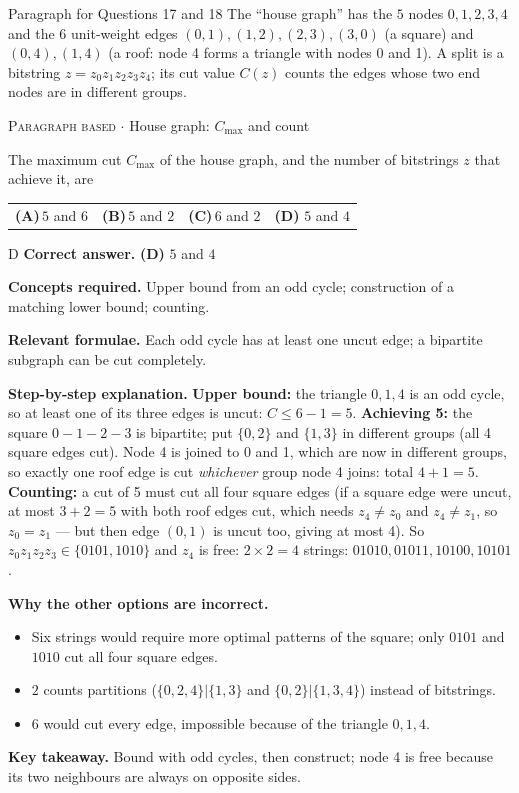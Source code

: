 \documentclass[11pt,a4paper]{article}
\newcommand{\optlabel}[1]{\textbf{(#1)}}
\newcommand{\correctlabel}[1]{\textcolor{okgreen}{\textbf{(#1)}\,\ding{51}}}
\newenvironment{qitem}[1]{\begin{list}{}{\setlength{\leftmargin}{3.3em}\setlength{\labelwidth}{3.1em}%
  \setlength{\labelsep}{0.2em}\setlength{\topsep}{3pt}\setlength{\parsep}{3pt}}\item[\textbf{Q.#1}\hfill]}{\end{list}}
\newcommand{\qmeta}[2]{{\footnotesize\color{black!60}\textsc{#1} \;$\cdot$\; #2}\par}
\begin{document}
\begin{passagebox}{Paragraph for Questions 17 and 18}
The ``house graph'' has the $5$ nodes $0, 1, 2, 3, 4$ and the $6$ unit-weight edges
$(0,1), (1,2), (2,3), (3,0)$ (a square) and $(0,4), (1,4)$ (a roof: node 4 forms a triangle with nodes 0 and 1).
A split is a bitstring $z = z_0z_1z_2z_3z_4$; its cut value $C(z)$ counts the edges whose two end nodes are in different
groups.
\end{passagebox}
\begin{qitem}{17}
\qmeta{Paragraph based}{House graph: $C_{\max}$ and count}
The maximum cut $C_{\max}$ of the house graph, and the number of bitstrings $z$ that achieve it, are
\par\smallskip\noindent\begin{tabularx}{\linewidth}{@{}*{4}{L}@{}}
\optlabel{A}\,$5$ and $6$ & \optlabel{B}\,$5$ and $2$ & \optlabel{C}\,$6$ and $2$ & \correctlabel{D}\,$5$ and $4$
\end{tabularx}
\end{qitem}
\begin{solbox}{D}
\textbf{\color{brand}Correct answer.} \textcolor{okgreen}{\textbf{(D)}} $5$ and $4$

\textbf{\color{brand}Concepts required.} Upper bound from an odd cycle; construction of a matching lower bound; counting.

\textbf{\color{brand}Relevant formulae.} Each odd cycle has at least one uncut edge; a bipartite subgraph can be cut completely.

\textbf{\color{brand}Step-by-step explanation.} \textbf{Upper bound:} the triangle $0,1,4$ is an odd cycle, so at least one of its three edges is uncut: $C \le 6 - 1 = 5$.
\textbf{Achieving 5:} the square $0{-}1{-}2{-}3$ is bipartite; put $\{0, 2\}$ and $\{1, 3\}$ in different groups (all 4 square
edges cut). Node 4 is joined to 0 and 1, which are now in different groups, so exactly one roof edge is cut \emph{whichever}
group node 4 joins: total $4 + 1 = 5$.
\textbf{Counting:} a cut of 5 must cut all four square edges (if a square edge were uncut, at most $3 + 2 = 5$ with both roof
edges cut, which needs $z_4 \neq z_0$ and $z_4 \neq z_1$, so $z_0 = z_1$ --- but then edge $(0,1)$ is uncut too, giving at most 4).
So $z_0z_1z_2z_3 \in \{0101, 1010\}$ and $z_4$ is free: $2 \times 2 = 4$ strings: $01010, 01011, 10100, 10101$.

\textbf{\color{brand}Why the other options are incorrect.}
\begin{itemize}[leftmargin=2.4em, itemsep=1pt, topsep=2pt]
\item[\textbf{(A)}] Six strings would require more optimal patterns of the square; only $0101$ and $1010$ cut all four square edges.
\item[\textbf{(B)}] $2$ counts partitions ($\{0,2,4\}|\{1,3\}$ and $\{0,2\}|\{1,3,4\}$) instead of bitstrings.
\item[\textbf{(C)}] $6$ would cut every edge, impossible because of the triangle $0, 1, 4$.
\end{itemize}
\textbf{\color{brand}Key takeaway.} Bound with odd cycles, then construct; node 4 is free because its two neighbours are always on opposite sides.
\end{solbox}
\end{document}
